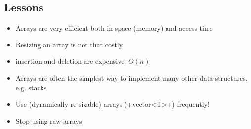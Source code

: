 \begin{slide}
\section{Lessons}

\begin{PauseHighLight}
  \begin{itemize}
  \item Arrays are very efficient both in space (memory) and access
    time\pause
  \item Resizing an array is not that costly\pause
  \item insertion and deletion are expensive, $O(n)$\pause
  \item Arrays are often the simplest way to implement many other
    data structures, e.g. stacks\pause
  \item Use (dynamically re-sizable) arrays (\jl+vector<T>+)
    frequently!\pause
  \item Stop using raw arrays\pauseb
  \end{itemize}
\end{PauseHighLight}

\end{slide}
